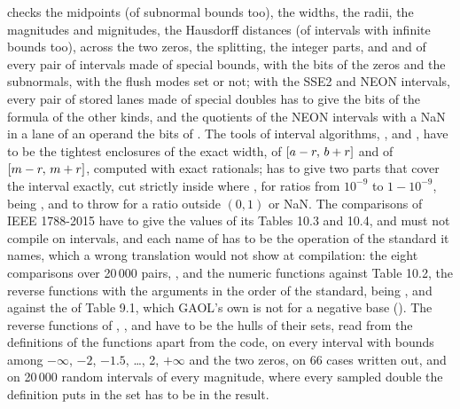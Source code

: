 \documentclass[12pt,a4paper,twoside,openright]{book}
\begin{document}
 checks the midpoints (of subnormal bounds too), the
widths, the radii, the magnitudes and mignitudes, the Hausdorff distances
(of intervals with infinite bounds too),  across
the two zeros, the splitting, the integer parts, and  and
 of every pair of intervals made of special bounds, with the
bits of the zeros and the subnormals, with the flush modes set or not; with
the SSE2 and NEON intervals, every pair of stored lanes made of special
doubles has to give the bits of the formula of the other kinds, and the
quotients of the NEON intervals with a NaN in a lane of an operand the bits
of . The tools of interval algorithms,
,  and
, have to be the tightest enclosures of the
exact width, of $[a-r,\,b+r]$ and of $[m-r,\,m+r]$, computed with exact
rationals;  has to give two parts that cover the
interval exactly, cut strictly inside where , for
ratios from $10^{-9}$ to $1-10^{-9}$,  being
, and to throw  for a ratio outside
$(0, 1)$ or NaN.\newinvfive{} The comparisons of IEEE 1788-2015 have to
give the values of its Tables 10.3 and 10.4, \code{==} and \code{!=} must
not compile on intervals, and each name of  has to be
the operation of the standard it names, which a wrong translation would not
show at compilation: the eight comparisons over 20\,000 pairs, ,
 and the numeric functions against Table 10.2, the reverse
functions with the arguments in the order of the standard,
 being , and 
against the  of Table 9.1, which GAOL's own  is not for
a negative base (). The reverse functions of
, ,  and \newinvfive{} have to be
the hulls of their sets, read from the definitions of the functions apart
from the code, on every interval with bounds among $-\infty$, $-2$, $-1.5$,
\dots, 2, $+\infty$ and the two zeros, on 66 cases written out, and on
20\,000 random intervals of every magnitude, where every sampled double the
definition puts in the set has to be in the result.
\end{document}
